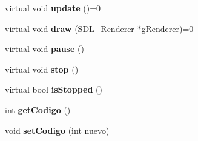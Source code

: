 \begin{DoxyCompactItemize}
\item 
virtual void {\bfseries update} ()=0\hypertarget{class_simple_animacion_a49ac1ea0fc728d1782f944f2af8c0b91}{}\label{class_simple_animacion_a49ac1ea0fc728d1782f944f2af8c0b91}

\item 
virtual void {\bfseries draw} (S\+D\+L\+\_\+\+Renderer $\ast$g\+Renderer)=0\hypertarget{class_simple_animacion_a95e4bc58cbcb479e1ae0507333aab95f}{}\label{class_simple_animacion_a95e4bc58cbcb479e1ae0507333aab95f}

\item 
virtual void {\bfseries pause} ()\hypertarget{class_simple_animacion_a252896da7acf3a42fb3b97ee45a4f7fb}{}\label{class_simple_animacion_a252896da7acf3a42fb3b97ee45a4f7fb}

\item 
virtual void {\bfseries stop} ()\hypertarget{class_simple_animacion_a895609b606404d07dfa35b1067e7c185}{}\label{class_simple_animacion_a895609b606404d07dfa35b1067e7c185}

\item 
virtual bool {\bfseries is\+Stopped} ()\hypertarget{class_simple_animacion_ad9c59cd0edad45c5a32d8453e6b3d34c}{}\label{class_simple_animacion_ad9c59cd0edad45c5a32d8453e6b3d34c}

\item 
int {\bfseries get\+Codigo} ()\hypertarget{class_simple_animacion_a8204b7fc4e5dd0140a7eb83de09c8315}{}\label{class_simple_animacion_a8204b7fc4e5dd0140a7eb83de09c8315}

\item 
void {\bfseries set\+Codigo} (int nuevo)\hypertarget{class_simple_animacion_a1e2efb425a063bb072a5a45de30720df}{}\label{class_simple_animacion_a1e2efb425a063bb072a5a45de30720df}

\end{DoxyCompactItemize}
